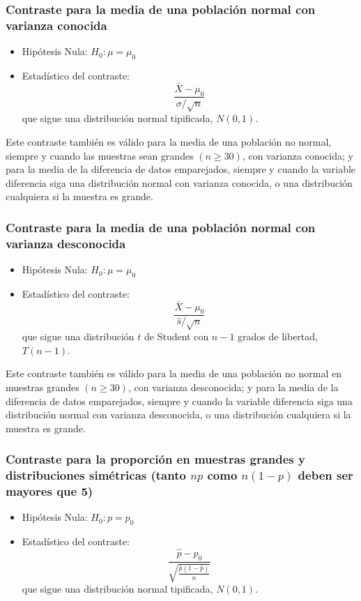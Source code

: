 \subsubsection{Contraste para la media de una población normal con
varianza conocida}
\begin{itemize}
\item Hipótesis Nula: $H_0:\mu=\mu_0$
\item Estadístico del contraste:
\[
\dfrac{\bar X-\mu_0}{\sigma/\sqrt{n}}
\]
que sigue una distribución normal tipificada, $N(0,1)$.
\end{itemize}
Este contraste también es válido para la media de una población no
normal, siempre y cuando las muestras sean grandes $(n\geq 30)$,
con varianza conocida; y para la media de la diferencia de datos
emparejados, siempre y cuando la variable diferencia siga una
distribución normal con varianza conocida, o una distribución
cualquiera si la muestra es grande.

\subsubsection{Contraste para la media de una población normal con
varianza desconocida}

\begin{itemize}
\item Hipótesis Nula: $H_0:\mu=\mu_0$
\item Estadístico del contraste:
\[
\frac{\bar X-\mu_0}{\hat s/\sqrt{n}}
\]
que sigue una distribución $t$ de Student con $n-1$ grados de
libertad, $T(n-1)$.
\end{itemize}
Este contraste también es válido para la media de una población no normal en
muestras grandes $(n\geq 30)$, con varianza desconocida; y para la media de la
diferencia de datos emparejados, siempre y cuando la variable diferencia siga
una distribución normal con varianza desconocida, o una distribución
cualquiera si la muestra es grande.

\subsubsection{Contraste para la proporción en muestras grandes y
distribuciones simétricas (tanto $np$ como $n(1-p)$ deben ser
mayores que 5)}
\begin{itemize}
    \item Hipótesis Nula: $H_0: p=p_0$
    \item Estadístico del contraste:
    \[
    \frac{{\hat p - p_0 }}{{\sqrt {\frac{{\hat p\left( {1 - \hat p} \right)}}{n}} }}
    \]
    que sigue una distribución normal tipificada, $N(0,1)$.
\end{itemize}


